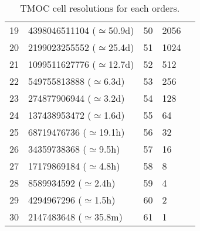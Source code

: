 \begin{table}[!htbp]
\begin{center}
{\begin{tabular} {|l | l| l| l| l|}
19      &       4398046511104 ($\simeq$50.9d)		& 50   & 2056 \\
20      &       2199023255552 ($\simeq$25.4d)		& 51   & 1024 \\
21      &       1099511627776 ($\simeq$12.7d)		& 52   & 512 \\
22      &       549755813888 ($\simeq$6.3d)		& 53   & 256 \\
23      &       274877906944 ($\simeq$3.2d)		& 54   & 128 \\
24      &       137438953472 ($\simeq$1.6d)		& 55   & 64 \\
25      &       68719476736 ($\simeq$19.1h)		& 56   & 32 \\
26      &       34359738368 ($\simeq$9.5h)		& 57   & 16 \\
27      &       17179869184 ($\simeq$4.8h)		& 58   & 8 \\
28      &       8589934592 ($\simeq$2.4h)		& 59   & 4 \\
29      &       4294967296 ($\simeq$1.5h)		& 60   & 2 \\
30      &       2147483648 ($\simeq$35.8m)		& 61   & 1 \\
   \hline
   \end{tabular}
   }
\caption[TMOC order and cell resolutions]{TMOC cell resolutions for each orders.}\label{table:tmocorders}
\end{center}
\end{table}
